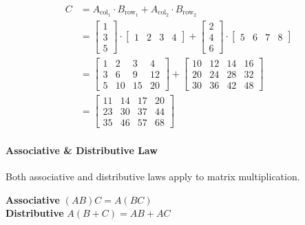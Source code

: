 \begin{align*}
	C & = A_{\text{col}_1} \cdot B_{\text{row}_1} + A_{\text{col}_2} \cdot B_{\text{row}_2} \\
	  & = \begin{bmatrix}
		      1 \\ 3 \\ 5
	      \end{bmatrix} \cdot \begin{bmatrix}
		                          1 & 2 & 3 & 4
	                          \end{bmatrix}
	+ \begin{bmatrix}
		  2 \\ 4 \\ 6
	  \end{bmatrix} \cdot \begin{bmatrix}
		                      5 & 6 & 7 & 8
	                      \end{bmatrix}                                                    \\
	  & = \begin{bmatrix}
		      1 & 2  & 3  & 4  \\
		      3 & 6  & 9  & 12 \\
		      5 & 10 & 15 & 20
	      \end{bmatrix}
	+ \begin{bmatrix}
		  10 & 12 & 14 & 16 \\
		  20 & 24 & 28 & 32 \\
		  30 & 36 & 42 & 48
	  \end{bmatrix}                                                                     \\
	  & = \begin{bmatrix}
		      11 & 14 & 17 & 20 \\
		      23 & 30 & 37 & 44 \\
		      35 & 46 & 57 & 68
	      \end{bmatrix}
\end{align*}

\paragraph{Associative \& Distributive Law} Both associative and distributive laws apply to matrix multiplication.

\begin{mdframed}
	\textbf{Associative} \quad $(AB)C = A(BC)$ \\
	\textbf{Distributive} \quad $A(B + C) = AB + AC$
\end{mdframed}

